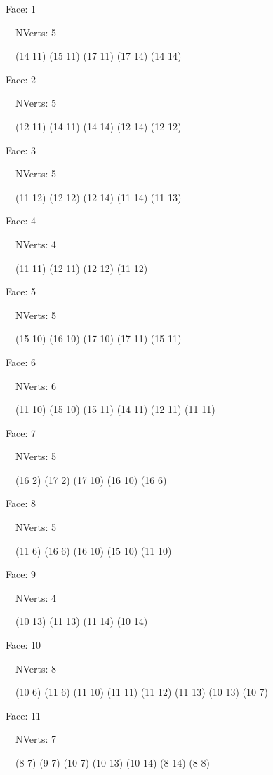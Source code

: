 \documentclass{article}
\begin{document}
{\footnotesize 

Face: 1

\   \    NVerts: 5

 \   \   (14 11) (15 11) (17 11) (17 14) (14 14)}

{\footnotesize 

Face: 2

\   \    NVerts: 5

 \   \   (12 11) (14 11) (14 14) (12 14) (12 12)}

{\footnotesize 

Face: 3

\   \    NVerts: 5

 \   \   (11 12) (12 12) (12 14) (11 14) (11 13)}

{\footnotesize 

Face: 4

\   \    NVerts: 4

 \   \   (11 11) (12 11) (12 12) (11 12)}

{\footnotesize 

Face: 5

\   \    NVerts: 5

 \   \   (15 10) (16 10) (17 10) (17 11) (15 11)}

{\footnotesize 

Face: 6

\   \    NVerts: 6

 \   \   (11 10) (15 10) (15 11) (14 11) (12 11) (11 11)}

{\footnotesize 

Face: 7

\   \    NVerts: 5

 \   \   (16 2) (17 2) (17 10) (16 10) (16 6)}

{\footnotesize 

Face: 8

\   \    NVerts: 5

 \   \   (11 6) (16 6) (16 10) (15 10) (11 10)}

{\footnotesize 

Face: 9

\   \    NVerts: 4

 \   \   (10 13) (11 13) (11 14) (10 14)}

{\footnotesize 

Face: 10

\   \    NVerts: 8

 \   \   (10 6) (11 6) (11 10) (11 11) (11 12) (11 13) (10 13) (10 7)}

{\footnotesize 

Face: 11

\   \    NVerts: 7

 \   \   (8 7) (9 7) (10 7) (10 13) (10 14) (8 14) (8 8)}
\end{document}
